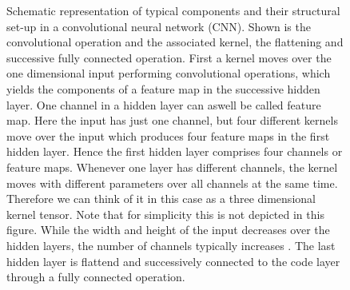 \begin{figure}
	\centering
	
	\caption{\footnotesize Schematic representation of typical components and their structural set-up in a convolutional neural network (CNN). Shown is the convolutional operation and the associated kernel, the flattening and successive fully connected operation. First a kernel moves over the one dimensional input performing convolutional operations, which yields the components of a feature map in the successive hidden layer. One channel in a hidden layer can aswell be called feature map. Here the input has just one channel, but four different kernels move over the input which produces four feature maps in the first hidden layer. Hence the first hidden layer comprises four channels or feature maps. Whenever one layer has different channels, the kernel moves with different parameters over all channels at the same time. Therefore we can think of it in this case as a three dimensional kernel tensor. Note that for simplicity this is not depicted in this figure. While the width and height of the input decreases over the hidden layers, the number of channels typically increases . The last hidden layer is flattend and successively connected to the code layer through a fully connected operation.}
	\label{Fig: Kernel}
\end{figure}\noindent
